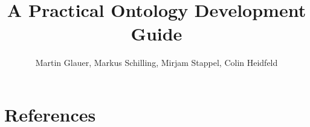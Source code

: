 \documentclass[final]{ol-softwaremanual}
\title{A Practical Ontology Development Guide}
\author{Martin Glauer, Markus Schilling, Mirjam Stappel, Colin Heidfeld}
\begin{document}
\maketitle

\listoftodos

\tableofcontents

\newpage





%


\section{References}



%
\end{document}

